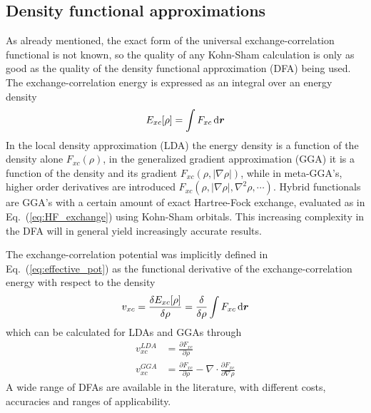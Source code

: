 \subsection{Density functional approximations}
As already mentioned, the exact form of the universal exchange-correlation functional is 
not known, so the quality of any Kohn-Sham calculation is only as good as the quality of
the density functional approximation (DFA) being used. The exchange-correlation energy is 
expressed as an integral over an energy density
\begin{equation}
    E_{xc}[\rho] = \int F_{xc}\,\mathrm{d} \boldsymbol r
\end{equation}
In the local density approximation (LDA) the energy density is a function of the density 
alone $F_{xc}(\rho)$, in the generalized gradient approximation (GGA) it is a function of
the density and its gradient $F_{xc}(\rho, |\nabla\rho|)$, while in meta-GGA's, higher 
order derivatives are introduced $F_{xc}(\rho, |\nabla\rho|, \nabla^2\rho, \cdots)$. 
Hybrid functionals are GGA's with a certain amount of exact Hartree-Fock exchange, 
evaluated as in Eq.~(\ref{eq:HF_exchange}) using Kohn-Sham orbitals. This increasing 
complexity in the DFA will in general yield increasingly accurate results.

The exchange-correlation potential was implicitly defined in Eq.~(\ref{eq:effective_pot}) 
as the functional derivative of the exchange-correlation energy with respect to the density
\begin{equation}
    v_{xc} = \frac{\delta E_{xc}[\rho]}{\delta \rho} 
	= \frac{\delta}{\delta \rho} \int F_{xc} \,\mathrm{d} \boldsymbol r
\end{equation}
which can be calculated for LDAs and GGAs through
\begin{align}
    \label{eq:LDA_pot}
    v_{xc}^{LDA} &= \frac{\partial F_{xc}}{\partial \rho}\\
    \label{eq:GGA_pot}
    v_{xc}^{GGA} &= \frac{\partial F_{xc}}{\partial \rho} - 
	\nabla\cdot\frac{\partial F_{xc}}{\partial\nabla\rho}
\end{align}
A wide range of DFAs are available in the literature, with different costs, accuracies and
ranges of applicability\cite{Burke:2012}.


